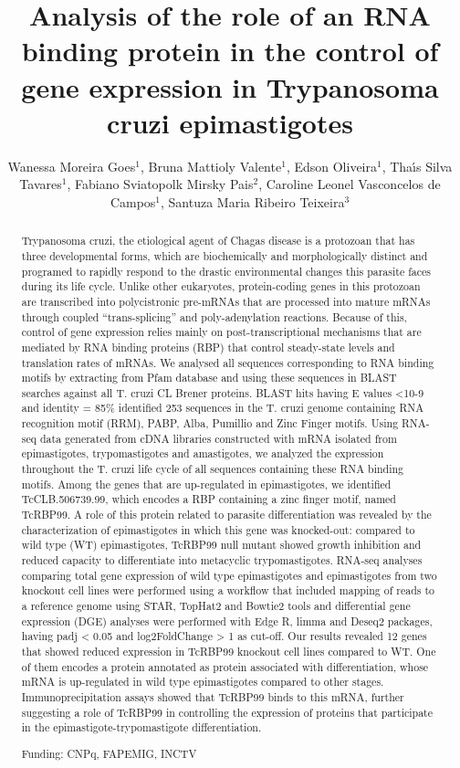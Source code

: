 \documentclass[twoside]{article}
\title{\vspace{-15mm}\fontsize{24pt}{10pt}\selectfont\textbf{Analysis of the role of an RNA binding protein in the control of gene expression in Trypanosoma cruzi epimastigotes}} %
\author{Wanessa Moreira Goes$^1$, Bruna Mattioly Valente$^1$, Edson Oliveira$^1$, Tha\'{\i}s Silva Tavares$^1$, Fabiano Sviatopolk Mirsky Pais$^2$, Caroline Leonel Vasconcelos de Campos$^1$, Santuza Maria Ribeiro Teixeira$^3$}
\affil{1 UFMG\\ 2 CENTRO DE PESQUISA REN\'E RACHOU, FIOCRUZ\\ 3 INSTITUTE OF BIOLOGICAL SCIENCES, UFMG\\ }
\date{}
\begin{document}
\maketitle %

\thispagestyle{fancy} %


\begin{abstract}
Trypanosoma cruzi, the etiological agent of Chagas disease is a protozoan that has three developmental forms, which are biochemically and morphologically distinct and programed to rapidly respond to the drastic environmental changes this parasite faces during its life cycle. Unlike other eukaryotes, protein-coding genes in this protozoan are transcribed into polycistronic pre-mRNAs that are processed into mature mRNAs through coupled ``trans-splicing'' and poly-adenylation reactions. Because of this, control of gene expression relies mainly on post-transcriptional mechanisms that are mediated by RNA binding proteins (RBP) that control steady-state levels and translation rates of mRNAs. We analysed all sequences corresponding to RNA binding motifs by extracting from Pfam database and using these sequences in BLAST searches against all T. cruzi CL Brener proteins. BLAST hits having E values <10-9 and identity = 85\% identified 253 sequences in the T. cruzi genome containing RNA recognition motif (RRM), PABP, Alba, Pumillio and Zinc Finger motifs. Using RNA-seq data generated from cDNA libraries constructed with mRNA isolated from epimastigotes, trypomastigotes and amastigotes, we analyzed the expression throughout the T. cruzi life cycle of all sequences containing these RNA binding motifs. Among the genes that are up-regulated in epimastigotes, we identified TcCLB.506739.99, which encodes a RBP containing a zinc finger motif, named TcRBP99. A role of this protein related to parasite differentiation was revealed by the characterization of epimastigotes in which this gene was knocked-out: compared to wild type (WT) epimastigotes, TcRBP99 null mutant showed growth inhibition and reduced capacity to differentiate into metacyclic trypomastigotes. RNA-seq analyses comparing total gene expression of wild type epimastigotes and epimastigotes from two knockout cell lines were performed using a workflow that included mapping of reads to a reference genome using STAR, TopHat2 and Bowtie2 tools and differential gene expression (DGE) analyses were performed with Edge R, limma and Deseq2 packages, having padj < 0.05 and log2FoldChange > 1 as cut-off. Our results revealed 12 genes that showed reduced expression in TcRBP99 knockout cell lines compared to WT. One of them encodes a protein annotated as protein associated with differentiation, whose mRNA is up-regulated in wild type epimastigotes compared to other stages. Immunoprecipitation assays showed that TcRBP99 binds to this mRNA, further suggesting a role of TcRBP99 in controlling the expression of proteins that participate in the epimastigote-trypomastigote differentiation.

Funding: CNPq, FAPEMIG, INCTV
\end{abstract}
\end{document}
